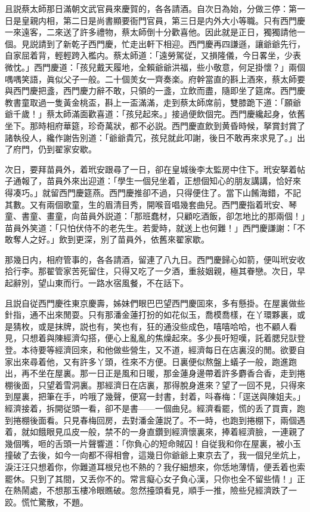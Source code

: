 且説蔡太師那日滿朝文武官員來慶賀的，各各請酒。自次日為始，分做三停：第一日是皇親内相，第二日是尚書顯要衙門官員，第三日是内外大小等職。只有西門慶一來遠客，二來送了許多禮物，蔡太師倒十分歡喜他。因此就是正日，獨獨請他一個。見説請到了新乾子西門慶，忙走出軒下相迎。西門慶再四謙遜，讓爺爺先行，自家屈着背，輕輕跨入檻内。蔡太師道：「遠勞駕従，又損隆儀，今日畧坐，少表微忱。」西門慶道：「孩兒戴天履地，全賴爺爺洪福，些小敬意，何足掛懷？」兩個喁喁笑語，眞似父子一般。二十個羙女一齊奏楽。府幹當直的斟上酒來，蔡太師要與西門慶把盞，西門慶力辭不敢，只領的一盞，立飲而盡，隨即坐了筵席。西門慶教書童取過一隻黃金桃盃，斟上一盃滿滿，走到蔡太師席前，雙膝跪下道：「願爺爺千歲！」蔡太師滿面歡喜道：「孩兒起來。」接過便飲個完。西門慶纔起身，依舊坐下。那時相府華筵，珍奇萬狀，都不必説。西門慶直飲到黄昏時候，拏賞封賞了諸執役人，纔作謝告別道：「爺爺貴冗，孩兒就此叩謝，後日不敢再來求見了。」出了府門，仍到翟家安歇。

次日，要拜苗員外，着玳安跟尋了一日，卻在皇城後李太監房中住下。玳安拏着帖子通報了，苗員外來出迎道：「學生一個兒坐着，正想個知心的朋友講講，恰好來得凑巧。」就留西門慶筵燕。西門慶推卻不過，只得便住了。當下山餚海錯，不記其數。又有兩個歌童，生的眉清目秀，開喉音唱幾套曲兒。西門慶指着玳安、琴童、書童、畫童，向苗員外説道：「那班蠢材，只顧吃酒飯，卻怎地比的那兩個！」苗員外笑道：「只怕伏侍不的老先生。若愛時，就送上也何難！」西門慶謙謝：「不敢奪人之好。」飲到更深，別了苗員外，依舊來翟家歇。

那幾日内，相府管事的，各各請酒，留連了八九日。西門慶歸心如箭，便叫玳安收拾行李。那翟管家苦死留住，只得又吃了一夕酒，重敍姻親，極其眷戀。次日，早起辭別，望山東而行。一路水宿風餐，不在話下。

且説自従西門慶徃東京慶壽，姊妹們眼巴巴望西門慶囬來，多有懸掛。在屋裏做些針指，通不出來閒耍。只有那潘金蓮打扮的如花似玉，喬模喬樣，在丫環夥裏，或是猜枚，或是抹牌，説也有，笑也有，狂的通没些成色，嘻嘻哈哈，也不顧人看見，只想着與陳經濟勾搭，便心上亂亂的焦燥起來。多少長吁短嘆，託着腮兒獃登登。本待要等經濟回來，和他做些營生，又不道，經濟每日在店裏沒的閒。欲要自家出來尋着他，又有許多丫頭，徃來不方便。日裏便似熬盤上蟻子一般，跑進跑出，再不坐在屋裏。那一日正是風和日暖，那金蓮身邊帶着許多麝香合香，走到捲棚後面，只望着雪洞裏。那經濟日在店裏，那得脫身進來？望了一回不見，只得來到屋裏，把筆在手，吟哦了幾聲，便寫一封書，封着，呌春梅：「逕送與陳姐夫。」經濟接着，拆開従頭一看，卻不是書——一個曲兒。經濟看罷，慌的丢了買賣，跑到捲棚後面看。只見春梅回房，去對潘金蓮説了。不一時，也跑到捲棚下，兩個遇着，就如餓眼見瓜皮一般，禁不的一身直鑽到經濟懷裏來，捧着經濟臉，一連親了幾個嘴，咂的舌頭一片聲響道：「你負心的短命賊囚！自従我和你在屋裏，被小玉撞破了去後，如今一向都不得相會，這幾日你爺爺上東京去了，我一個兒坐炕上，淚汪汪只想着你，你難道耳根兒也不熱的？我仔細想來，你恁地薄情，便丢着也索罷休。只到了其間，又丢你不的。常言癡心女子負心漢，只你也全不留些情！」正在熱鬧處，不想那玉樓冷眼瞧破。忽然擡頭看見，順手一推，險些兒經濟跌了一跤。慌忙驚散，不題。

